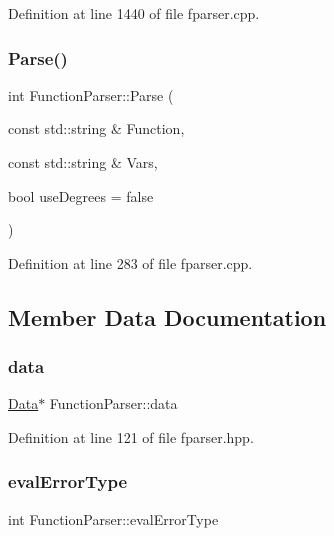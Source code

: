 Definition at line 1440 of file fparser.\+cpp.

\mbox{\label{class_function_parser_af4e0b209ec9771dcd76e27f3fcad1b51}} 
\subsubsection{\texorpdfstring{Parse()}{Parse()}}
{\footnotesize\ttfamily int Function\+Parser\+::\+Parse (\begin{DoxyParamCaption}\item[{const std\+::string \&}]{Function,  }\item[{const std\+::string \&}]{Vars,  }\item[{bool}]{use\+Degrees = {\ttfamily false} }\end{DoxyParamCaption})}



Definition at line 283 of file fparser.\+cpp.



\subsection{Member Data Documentation}
\mbox{\label{class_function_parser_ac4c90e783d1a41f8f842383a9a5088d0}} 
\subsubsection{\texorpdfstring{data}{data}}
{\footnotesize\ttfamily \hyperlink{struct_function_parser_1_1_data}{Data}$\ast$ Function\+Parser\+::data\hspace{0.3cm}{\ttfamily [private]}}



Definition at line 121 of file fparser.\+hpp.

\mbox{\label{class_function_parser_a43c35628fcb4a11d459e48265eca45df}} 
\subsubsection{\texorpdfstring{eval\+Error\+Type}{evalErrorType}}
{\footnotesize\ttfamily int Function\+Parser\+::eval\+Error\+Type\hspace{0.3cm}{\ttfamily [private]}}



